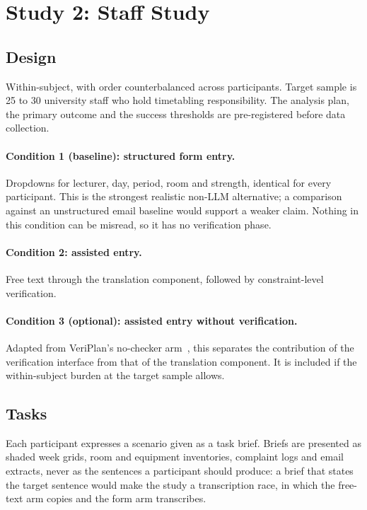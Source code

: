 \documentclass[acmsmall,screen,review,anonymous]{acmart}
\begin{document}
\section{Study 2: Staff Study}
\label{sec:study2}

\subsection{Design}

Within-subject, with order counterbalanced across participants. Target sample
is 25 to 30 university staff who hold timetabling responsibility. The analysis
plan, the primary outcome and the success thresholds are pre-registered before
data collection.

\paragraph{Condition 1 (baseline): structured form entry.}
Dropdowns for lecturer, day, period, room and strength, identical for every
participant. This is the strongest realistic non-LLM alternative; a comparison
against an unstructured email baseline would support a weaker claim. Nothing
in this condition can be misread, so it has no verification phase.

\paragraph{Condition 2: assisted entry.}
Free text through the translation component, followed by constraint-level
verification.

\paragraph{Condition 3 (optional): assisted entry without verification.}
Adapted from VeriPlan's no-checker arm~\cite{lee2025veriplan}, this separates
the contribution of the verification interface from that of the translation
component. It is included if the within-subject burden at the target sample
allows.

\subsection{Tasks}

Each participant expresses a scenario given as a task brief. Briefs are
presented as shaded week grids, room and equipment inventories, complaint logs
and email extracts, never as the sentences a participant should produce: a
brief that states the target sentence would make the study a transcription
race, in which the free-text arm copies and the form arm transcribes.
\end{document}
